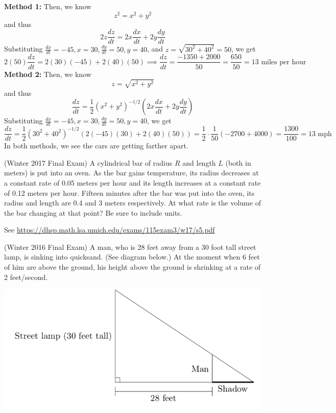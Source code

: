 \documentclass[11pt]{exam}
\begin{document}
\begin{questions}
\begin{solution}
      \textbf{Method 1:} Then, we know \[
        z^2 = x^2 + y^2
      \]
      and thus \[
        2z\frac{dz}{dt}  = 2x\frac{dx}{dt} + 2y\frac{dy}{dt}
      \]
      Substituting \(\frac{dx}{dt} = -45, x=30, \frac{dy}{dt} = 50,
      y=40\), and \(z = \sqrt{30^2+40^2} = 50\), we get \[
        2(50) \frac{dz}{dt} = 2(30)(-45) + 2(40)(50)
        \implies\frac{dz}{dt}  = \frac{-1350+2000}{50} =
        \frac{650}{50} = 13 \text{ miles per hour}
      \]
      \textbf{Method 2:} Then, we know \[
        z = \sqrt{x^2+y^2}
      \]
      and thus \[
        \frac{dz}{dt} = \frac{1}{2} (x^2+y^2)^{-1/2}\left(2x\frac{dx}{dt}+2y\frac{dy}{dt}\right)
      \]
      Substituting \(\frac{dx}{dt} = -45, x=30, \frac{dy}{dt} = 50,
      y=40\), we get \[
        \frac{dz}{dt} = \frac{1}{2}
        (30^2+40^2)^{-1/2}\left(2(-45)(30)+2(40)(50)\right)
        =\frac{1}{2}\cdot \frac{1}{50}(-2700+4000) = \frac{1300}{100}
       = 13\text{ mph}
      \]
      In both methods, we see the cars are getting farther apart.
    \end{solution}
\question (Winter 2017 Final Exam) %
A cylindrical bar of radius $R$ and length $L$ (both in meters) is put into an oven. As the bar gains temperature, its radius decreases at a constant rate of 0.05 meters per hour and its length increases at a constant rate of 0.12 meters per hour. Fifteen minutes after the bar was put into the oven, its radius and length are 0.4 and 3 meters respectively. At what rate is the volume of the bar changing at that point? Be sure to include units.
\begin{solution}
  See \href{https://dhsp.math.lsa.umich.edu/exams/115exam3/w17/s5.pdf}{https://dhsp.math.lsa.umich.edu/exams/115exam3/w17/s5.pdf}
\end{solution}
\question (Winter 2016 Final Exam) %
A man, who is 28 feet away from a 30 foot tall street lamp, is sinking into quicksand. (See diagram below.) At the moment when 6 feet of him are above the ground, his height above the ground is shrinking at a rate of 2 feet/second.
\begin{center}
\includegraphics[scale=0.5]{Figures/shadow.png}

\end{center}
\end{questions}
\end{document}
